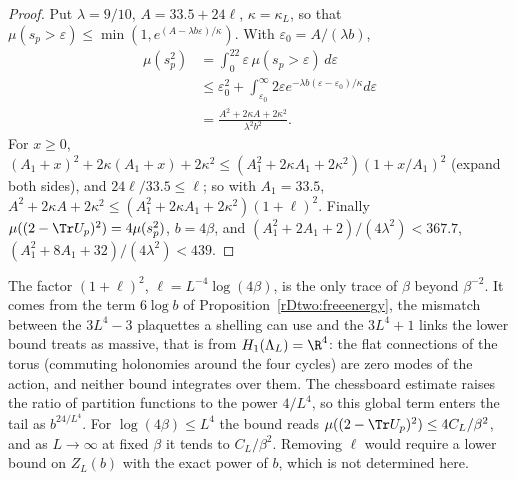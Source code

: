 \begin{proof}
Put $\lambda=9/10$, $A=33.5+24\ell$, $\kappa=\kappa_L$, so that $\mu(s_p>
\varepsilon)\le\min(1,e^{(A-\lambda b\varepsilon)/\kappa})$. With $\varepsilon
_0=A/(\lambda b)$,
\[
\begin{split}
\mu(s_p^2)&=\int_0^22\varepsilon\,\mu(s_p>\varepsilon)\,d\varepsilon\\
&\le\varepsilon_0^2+\int_{\varepsilon_0}^\infty2\varepsilon
e^{-\lambda b(\varepsilon-\varepsilon_0)/\kappa}d\varepsilon\\
&=\frac{A^2+2\kappa A+2\kappa^2}{\lambda^2b^2}.
\end{split}
\]
For $x\ge0$, $(A_1+x)^2+2\kappa(A_1+x)+2\kappa^2\le(A_1^2+2\kappa A_1+2
\kappa^2)(1+x/A_1)^2$ (expand both sides), and $24\ell/33.5\le\ell$; so with
$A_1=33.5$, $A^2+2\kappa A+2\kappa^2\le(A_1^2+2\kappa A_1+2\kappa^2)(1+\ell)
^2$. Finally $\mu((2-\Tr U_p)^2)=4\mu(s_p^2)$, $b=4\beta$, and $(A_1^2+2A_1+
2)/(4\lambda^2)<367.7$, $(A_1^2+8A_1+32)/(4\lambda^2)<439$.
\end{proof}

\begin{remark}\label{rDtwo:zeromodes}
The factor $(1+\ell)^2$, $\ell=L^{-4}\log(4\beta)$, is the only trace of
$\beta$ beyond $\beta^{-2}$. It comes from the term $6\log b$ of
Proposition~\ref{rDtwo:freeenergy}, the mismatch between the $3L^4-3$
plaquettes a shelling can use and the $3L^4+1$ links the lower bound treats
as massive, that is from $H_1(\Lambda_L)=\R^4$: the flat connections of the
torus (commuting holonomies around the four cycles) are zero modes of the
action, and neither bound integrates over them. The chessboard estimate
raises the ratio of partition functions to the power $4/L^4$, so this
global term enters the tail as $b^{24/L^4}$. For $\log(4\beta)\le L^4$ the
bound reads $\mu((2-\Tr U_p)^2)\le4C_L/\beta^2$, and as $L\to\infty$ at
fixed $\beta$ it tends to $C_L/\beta^2$. Removing $\ell$ would require a
lower bound on $Z_L(b)$ with the exact power of $b$, which is not
determined here.
\end{remark}

